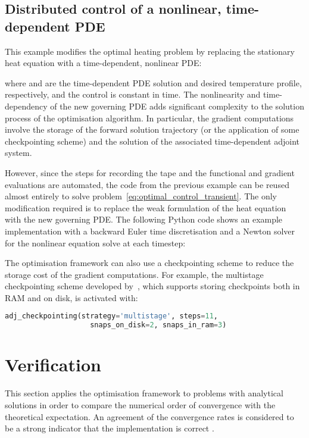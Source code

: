 \documentclass[prodmode,acmtoms]{acmsmall}
\begin{document}
\subsection{Distributed control of a nonlinear, time-dependent PDE}


This example modifies the optimal heating problem by replacing the stationary heat equation with a time-dependent, nonlinear PDE:

where  and  are the time-dependent PDE solution and desired temperature profile, respectively, 
and the control  is constant in time.
The nonlinearity and time-dependency of the new governing PDE
adds significant complexity to the solution process of the optimisation algorithm.
In particular, the gradient computations involve the storage of the forward solution trajectory (or the application of some checkpointing scheme) and 
the solution of the associated time-dependent adjoint system. 

However, since the steps for recording the tape and the functional and gradient evaluations are automated,
the code from the previous example can be reused almost entirely to solve problem~\eqref{eq:optimal_control_transient}. 
The only modification required is to replace the weak formulation of the heat equation with the new governing PDE. 
The following Python code shows an example implementation with a backward Euler time discretisation and a Newton solver for the nonlinear equation solve at each timestep:


The optimisation framework can also use a checkpointing scheme to reduce the storage cost of the gradient computations.
For example, the multistage checkpointing scheme developed by~, which supports storing checkpoints both in RAM and on disk, is activated with:
\begin{lstlisting}[language=Python,numbers=none]
adj_checkpointing(strategy='multistage', steps=11, 
                    snaps_on_disk=2, snaps_in_ram=3)
\end{lstlisting}

\section{Verification}\label{sec:verification}
This section applies the optimisation framework to problems with analytical solutions in order to compare the numerical order of convergence with the theoretical expectation.
An agreement of the convergence rates is considered to be a strong  indicator that the implementation is correct \cite{salari2000}.
\end{document}
